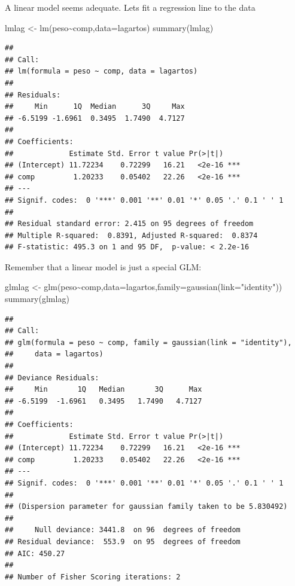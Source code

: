 \documentclass[
]{book}
\newenvironment{Shaded}{\begin{snugshade}}{\end{snugshade}}
\newcommand{\AttributeTok}[1]{\textcolor[rgb]{0.77,0.63,0.00}{#1}}
\newcommand{\FunctionTok}[1]{\textcolor[rgb]{0.00,0.00,0.00}{#1}}
\newcommand{\NormalTok}[1]{#1}
\newcommand{\OtherTok}[1]{\textcolor[rgb]{0.56,0.35,0.01}{#1}}
\newcommand{\SpecialCharTok}[1]{\textcolor[rgb]{0.00,0.00,0.00}{#1}}
\newcommand{\StringTok}[1]{\textcolor[rgb]{0.31,0.60,0.02}{#1}}
\begin{document}
A linear model seems adequate. Lets fit a regression line to the data

\begin{Shaded}
\begin{Highlighting}[]
\NormalTok{lmlag }\OtherTok{\textless{}{-}} \FunctionTok{lm}\NormalTok{(peso}\SpecialCharTok{\textasciitilde{}}\NormalTok{comp,}\AttributeTok{data=}\NormalTok{lagartos)}
\FunctionTok{summary}\NormalTok{(lmlag)}
\end{Highlighting}
\end{Shaded}

\begin{verbatim}
## 
## Call:
## lm(formula = peso ~ comp, data = lagartos)
## 
## Residuals:
##     Min      1Q  Median      3Q     Max 
## -6.5199 -1.6961  0.3495  1.7490  4.7127 
## 
## Coefficients:
##             Estimate Std. Error t value Pr(>|t|)    
## (Intercept) 11.72234    0.72299   16.21   <2e-16 ***
## comp         1.20233    0.05402   22.26   <2e-16 ***
## ---
## Signif. codes:  0 '***' 0.001 '**' 0.01 '*' 0.05 '.' 0.1 ' ' 1
## 
## Residual standard error: 2.415 on 95 degrees of freedom
## Multiple R-squared:  0.8391, Adjusted R-squared:  0.8374 
## F-statistic: 495.3 on 1 and 95 DF,  p-value: < 2.2e-16
\end{verbatim}

Remember that a linear model is just a special GLM:

\begin{Shaded}
\begin{Highlighting}[]
\NormalTok{glmlag }\OtherTok{\textless{}{-}} \FunctionTok{glm}\NormalTok{(peso}\SpecialCharTok{\textasciitilde{}}\NormalTok{comp,}\AttributeTok{data=}\NormalTok{lagartos,}\AttributeTok{family=}\FunctionTok{gaussian}\NormalTok{(}\AttributeTok{link=}\StringTok{"identity"}\NormalTok{))}
\FunctionTok{summary}\NormalTok{(glmlag)}
\end{Highlighting}
\end{Shaded}

\begin{verbatim}
## 
## Call:
## glm(formula = peso ~ comp, family = gaussian(link = "identity"), 
##     data = lagartos)
## 
## Deviance Residuals: 
##     Min       1Q   Median       3Q      Max  
## -6.5199  -1.6961   0.3495   1.7490   4.7127  
## 
## Coefficients:
##             Estimate Std. Error t value Pr(>|t|)    
## (Intercept) 11.72234    0.72299   16.21   <2e-16 ***
## comp         1.20233    0.05402   22.26   <2e-16 ***
## ---
## Signif. codes:  0 '***' 0.001 '**' 0.01 '*' 0.05 '.' 0.1 ' ' 1
## 
## (Dispersion parameter for gaussian family taken to be 5.830492)
## 
##     Null deviance: 3441.8  on 96  degrees of freedom
## Residual deviance:  553.9  on 95  degrees of freedom
## AIC: 450.27
## 
## Number of Fisher Scoring iterations: 2
\end{verbatim}
\end{document}
